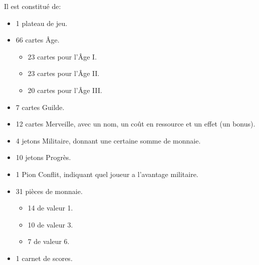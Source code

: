 \documentclass[a4paper, 12pt, french]{article}
\begin{document}
	Il est constitué de:
	\begin{itemize}
		\item 1 plateau de jeu.
		\item 66 cartes Âge.
		\begin{itemize}
			\item 23 cartes pour l'Âge I.
			\item 23 cartes pour l'Âge II.
			\item 20 cartes pour l'Âge III.
		\end{itemize}
		\item 7 cartes Guilde.
		\item 12 cartes Merveille, avec un nom, un coût en ressource et un effet (un bonus).
		\item 4 jetons Militaire, donnant une certaine somme de monnaie.
		\item 10 jetons Progrès.
		\item 1 Pion Conflit, indiquant quel joueur a l'avantage militaire.
		\item 31 pièces de monnaie.
		\begin{itemize}
			\item 14 de valeur 1.
			\item 10 de valeur 3.
			\item 7 de valeur 6.
		\end{itemize}
		\item 1 carnet de scores.
	\end{itemize}
\end{document}
